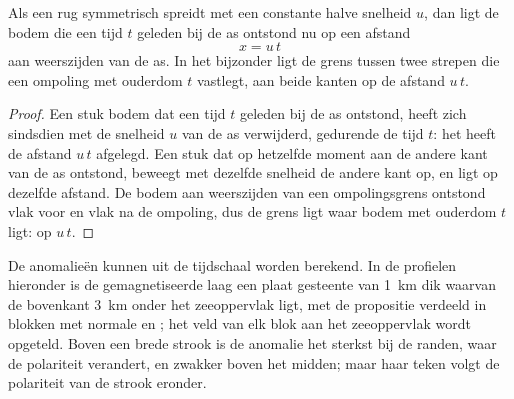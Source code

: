 \begin{proposition}\label{prop:g11:drift-to-spreading:stripe}
Als een rug symmetrisch spreidt met een constante halve snelheid $u$, dan ligt de
bodem die een tijd $t$ geleden bij de as ontstond nu op een afstand
\[
  x = u\,t
\]
aan weerszijden van de as. In het bijzonder ligt de grens tussen twee strepen die
een ompoling met ouderdom $t$ vastlegt, aan beide kanten op de afstand $u\,t$.
\end{proposition}

\begin{proof}
Een stuk bodem dat een tijd $t$ geleden bij de as ontstond, heeft zich sindsdien
met de snelheid $u$ van de as verwijderd, gedurende de tijd $t$: het heeft de
afstand $u\,t$ afgelegd. Een stuk dat op hetzelfde moment aan de andere kant van
de as ontstond, beweegt met dezelfde snelheid de andere kant op, en ligt op
dezelfde afstand. De bodem aan weerszijden van een ompolingsgrens ontstond vlak voor
en vlak na de ompoling, dus de grens ligt waar bodem met ouderdom $t$ ligt: op $u\,t$.
\end{proof}

De anomalieën kunnen uit de tijdschaal worden berekend. In de profielen hieronder
is de gemagnetiseerde laag een plaat gesteente van \qty{1}{km} dik waarvan de
bovenkant \qty{3}{km} onder het zeeoppervlak ligt, met de propositie verdeeld in
blokken met normale en ; het veld van elk blok aan het
zeeoppervlak wordt opgeteld. Boven een brede strook is de anomalie het sterkst
bij de randen, waar de polariteit verandert, en zwakker boven het midden; maar
haar teken volgt de polariteit van de strook eronder.


